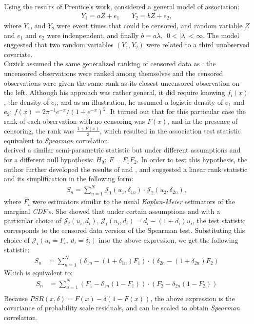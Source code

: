 \documentclass[]{article}
\begin{document}
Using the results of Prentice's work, \cite{cuzick1982rank} considered a general model of association:
	$$
	\begin{aligned}
		Y_1 = aZ + e_1 ~~~~~~~~ Y_2 = bZ + e_2,
	\end{aligned}
	$$
where $Y_1$, and $Y_2$ were event times that could be censored, and random variable $Z$ and $e_1$ and $e_2$ were indenpendent, and finally $b=a\lambda,~~0<|\lambda|<\infty$. The model suggested that two random variables $(Y_1, Y_2)$ were related to a third unobserved covariate.\\
Cuzick assumed the same generalized ranking of censored data as \cite{prentice1978linear}: the uncensored observations were ranked among themselves and the censored observations were given the same rank as its closest uncensored observation on the left. Although his approach was rather general, it did require knowing $f_i(x)$, the density of $e_i$, and as an illustration, he assumed a logistic density of $e_1$ and $e_2$:  $f(x) = 2\pi^{-1} e^{-x}/(1+e^{-x})^2$. It turned out that for this particular case the rank of each observation with no censoring was $F(x)$, and in the presence of censoring, the rank was $\frac{1+F(x)}{2}$, which resulted in the association test statistic equivalent to \emph{Spearman} correlation.\\

\cite{dabrowska1986rank} derived a similar semi-parametric statistic but under different assumptions and for a different null hypothesis: $H_0:~F=F_1 F_2$. In order to test this hypothesis, the author further developed the results of \cite{prentice1978linear} and \cite{cuzick1982rank} , and suggested a linear rank statistic and its simplification in the following form:
	$$
	\begin{aligned}
		 S_n = \sum_{n=1}^N \mathcal{J}_1( u_1, \delta_{1n}) \cdot \mathcal{J}_2( u_2, \delta_{2n}),
	\end{aligned}
	$$
where $\hat{F}_i$ were estimators similar to the usual \emph{Kaplan-Meier} estimators of the marginal \emph{CDF}'s. She showed that under certain assumptions and with a particular choice of $\mathcal{J}_i(u_i,d_i)$, $\mathcal{J}_i(u_i,d_i) =d_i-(1+d_i)u_i$, the test statistic corresponds to the censored data version of the Spearman test. Substituting this choice of $\mathcal{J}_i(u_i=F_i,~d_i=\delta_i)$ into the above expression, we get the following statistic:
	$$
	\begin{aligned}
		 S_n & = \sum_{n=1}^N (\delta_{1n} - (1+\delta_{1n})F_1)\cdot (\delta_{2n} - (1+\delta_{2n})F_2)
	\end{aligned}
	$$
  Which is equivalent to:
	$$
	\begin{aligned}
		 S_n & = \sum_{n=1}^N (F_1 - \delta_{1n}(1-F_1))\cdot (F_2 - \delta_{2n}(1-F_2))\\
	\end{aligned}
	$$
Because $PSR(x, \delta) = F(x)-\delta(1-F(x))$, the above expression is the covariance of probability scale residuals, and can be scaled to obtain \emph{Spearman} correlation.\\
\end{document}
